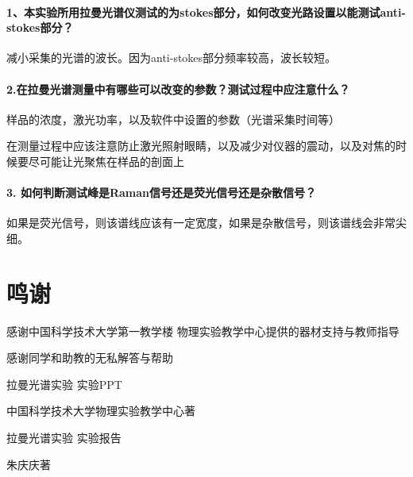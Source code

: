 \documentclass[hyperref]{ctexart}
\begin{document}
\begin{multicols}{2}
		\paragraph{1、本实验所用拉曼光谱仪测试的为stokes部分，如何改变光路设置以能测试anti-stokes部分？}
		
		减小采集的光谱的波长。因为anti-stokes部分频率较高，波长较短。
		
		
		\paragraph{2.在拉曼光谱测量中有哪些可以改变的参数？测试过程中应注意什么？}
		
		样品的浓度，激光功率，以及软件中设置的参数（光谱采集时间等）
		
		
		在测量过程中应该注意防止激光照射眼睛，以及减少对仪器的震动，以及对焦的时候要尽可能让光聚焦在样品的剖面上
		
		
		\paragraph{3. 如何判断测试峰是Raman信号还是荧光信号还是杂散信号？}
		
		如果是荧光信号，则该谱线应该有一定宽度，如果是杂散信号，则该谱线会非常尖细。
		
		\section*{鸣谢}
		感谢中国科学技术大学第一教学楼 物理实验教学中心提供的器材支持与教师指导
		
		
		感谢同学和助教的无私解答与帮助
		
		
		\begin{thebibliography}{100}%
			拉曼光谱实验 实验PPT
			
			
			中国科学技术大学物理实验教学中心\quad 著
			
			拉曼光谱实验 实验报告
			
			朱庆庆\quad 著
			
		\end{thebibliography}
		
	\end{multicols}
\end{document}
